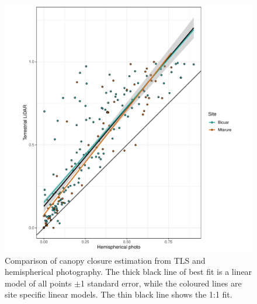 \begin{refsection}
\begin{figure}
\centering
	\includegraphics[width=\linewidth]{img/tls_hemi_compare}
	\caption[Comparison of hemispherical photography and TLS canopy closure measurements]{Comparison of canopy closure estimation from TLS and hemispherical photography. The thick black line of best fit is a linear model of all points $\pm$1 standard error, while the coloured lines are site specific linear models. The thin black line shows the 1:1 fit.}
	\label{workflow:tls_hemi_compare}
\end{figure}


\end{refsection}

